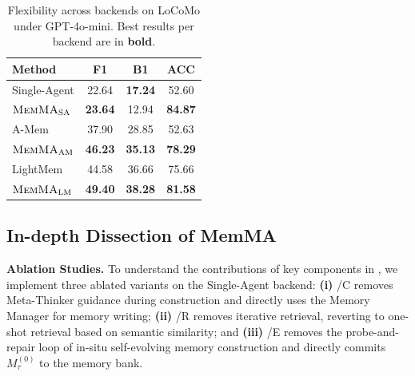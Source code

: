 \begin{table}[t]
\centering
\small
\caption{Flexibility across backends on LoCoMo under GPT-4o-mini. Best results per backend are in \textbf{bold}.}
\label{tab:backend_results}
{
\begin{tabular}{lccc}
\toprule
\textbf{Method} & \textbf{F1} & \textbf{B1} & \textbf{ACC} \\
\midrule
Single-Agent  & 22.64 & \textbf{17.24} & 52.60 \\
$\textnormal{\textsc{MemMA}}_{\mathrm{SA}}$ & \textbf{23.64} & 12.94 & \textbf{84.87} \\
\midrule
A-Mem & 37.90 & 28.85 & 52.63 \\
$\textnormal{\textsc{MemMA}}_{\mathrm{AM}}$ & \textbf{46.23} & \textbf{35.13} & \textbf{78.29} \\
\midrule
LightMem & 44.58 & 36.66 & 75.66 \\
$\textnormal{\textsc{MemMA}}_{\mathrm{LM}}$ & \textbf{49.40} & \textbf{38.28} & \textbf{81.58} \\
\bottomrule
\end{tabular}}
\vspace{-0.5em}
\end{table}


\subsection{In-depth Dissection of MemMA}
\label{ssec:ablation}
\noindent\textbf{Ablation Studies.}
To understand the contributions of key components in \method, we implement three ablated variants on the Single-Agent backend: 
\textbf{(i)} \method/C removes Meta-Thinker guidance during construction and directly uses the Memory Manager for memory writing;
\textbf{(ii)} \method/R removes iterative retrieval, reverting to one-shot retrieval based on semantic similarity; and
\textbf{(iii)} \method/E removes the probe-and-repair loop of in-situ self-evolving memory construction and directly commits $M_{\tau}^{(0)}$ to the memory bank.


